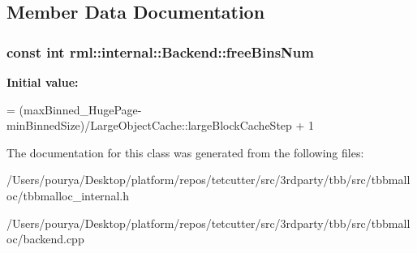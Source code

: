 \subsection{Member Data Documentation}
\hypertarget{classrml_1_1internal_1_1Backend_aa40317699d588c417d4bc3e6dbdd4cbd}{}
\subsubsection[{free\+Bins\+Num}]{\setlength{\rightskip}{0pt plus 5cm}const int rml\+::internal\+::\+Backend\+::free\+Bins\+Num\hspace{0.3cm}{\ttfamily [static]}}\label{classrml_1_1internal_1_1Backend_aa40317699d588c417d4bc3e6dbdd4cbd}
{\bfseries Initial value\+:}
\begin{DoxyCode}
=
        (maxBinned\_HugePage-minBinnedSize)/LargeObjectCache::largeBlockCacheStep + 1
\end{DoxyCode}


The documentation for this class was generated from the following files\+:\begin{DoxyCompactItemize}
\item 
/\+Users/pourya/\+Desktop/platform/repos/tetcutter/src/3rdparty/tbb/src/tbbmalloc/tbbmalloc\+\_\+internal.\+h\item 
/\+Users/pourya/\+Desktop/platform/repos/tetcutter/src/3rdparty/tbb/src/tbbmalloc/backend.\+cpp\end{DoxyCompactItemize}
